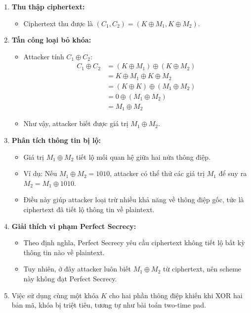 \begin{enumerate}
    \item \textbf{Thu thập ciphertext:}
    \begin{itemize}
        \item Ciphertext thu được là $(C_1, C_2) = (K \oplus M_1, K \oplus M_2)$.
    \end{itemize}

    \item \textbf{Tấn công loại bỏ khóa:}
    \begin{itemize}
        \item Attacker tính $C_1 \oplus C_2$:
        \begin{align*}
            C_1 \oplus C_2 &= (K \oplus M_1) \oplus (K \oplus M_2) \\
            &= K \oplus M_1 \oplus K \oplus M_2 \\
            &= (K \oplus K) \oplus (M_1 \oplus M_2) \\
            &= 0 \oplus (M_1 \oplus M_2) \\
            &= M_1 \oplus M_2
        \end{align*}
        \item Như vậy, attacker biết được giá trị $M_1 \oplus M_2$.
    \end{itemize}

    \item \textbf{Phân tích thông tin bị lộ:}
    \begin{itemize}
        \item Giá trị $M_1 \oplus M_2$ tiết lộ mối quan hệ giữa hai nửa thông điệp.
        \item Ví dụ: Nếu $M_1 \oplus M_2 = 1010$, attacker có thể thử các giá trị $M_1$ để suy ra $M_2 = M_1 \oplus 1010$.
        \item Điều này giúp attacker loại trừ nhiều khả năng về thông điệp gốc, tức là ciphertext đã tiết lộ thông tin về plaintext.
    \end{itemize}

    \item \textbf{Giải thích vi phạm Perfect Secrecy:}
    \begin{itemize}
        \item Theo định nghĩa, Perfect Secrecy yêu cầu ciphertext không tiết lộ bất kỳ thông tin nào về plaintext.
        \item Tuy nhiên, ở đây attacker luôn biết $M_1 \oplus M_2$ từ ciphertext, nên scheme này không đạt Perfect Secrecy.
    \end{itemize}

    \item Việc sử dụng cùng một khóa $K$ cho hai phần thông điệp khiến khi XOR hai bản mã, khóa bị triệt tiêu, tương tự như bài toán two-time pad.

\end{enumerate}